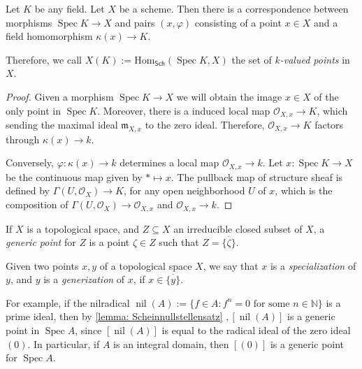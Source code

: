 \documentclass[11pt]{article}
\newcommand{\Spec}{\operatorname{Spec}}
\begin{document}
\begin{lemma}
    \cite[Exercise II.2.7]{hartsAG}
    Let $ K $ be any field. Let $ X $ be a scheme. Then there is a correspondence between morphisms 
    $ \Spec K \to X $ and pairs $ (x,\varphi) $ consisting of a point $ x \in X $ and a field homomorphism 
    $ \kappa(x) \to K $. 
    
    Therefore, we call $ X(K):= \mathrm{Hom}_{\mathsf{Sch}}(\Spec K,X) $ the set of $ k $\emph{-valued points} in $ X $. 
\end{lemma}

\begin{proof}
    Given a morphism $ \Spec K \to X $ we will obtain the image $ x \in X $ of the only point in $ \Spec K $. 
    Moreover, there is a induced local map $ \mathscr{O}_{X,x} \to K $, which sending the maximal ideal 
    $ \mathfrak{m}_{X,x} $ to the zero ideal. Therefore, $ \mathscr{O}_{X,x} \to K $ factors through 
    $ \kappa(x) \to k $. 
    
    Conversely, $ \varphi: \kappa(x) \to k $ determines a local map $ \mathscr{O}_{X,x} \to k $. 
    Let $ x: \Spec K \to X $ be the continuous map given by $ * \mapsto x $. 
    The pullback map of structure sheaf is defined by $ \Gamma(U,\mathscr{O}_{X}) \to K $, for any 
    open neighborhood $ U $ of $ x $, which is the composition of $ \Gamma(U,\mathscr{O}_{X}) \to \mathscr{O}_{X,x}$ 
    and $ \mathscr{O}_{X,x} \to k $. 
\end{proof}


\begin{definition}
    If $ X $ is a topological space, and $ Z \subseteq X $ an irreducible closed subset of $ X $, 
    a \emph{generic point} for $ Z $ is a point $ \zeta \in Z $ such that $ Z = \overline{\{ \zeta \}} $. 

    Given two points $ x,y $ of a topological space $ X $, we say that $ x $ is a \emph{specialization} 
    of $ y $, and $ y $ is a \emph{generization} of $ x $, if $ x \in \overline{\{ y \}} $. 
\end{definition}

For example, if the nilradical $ \operatorname{nil}(A):= \{f \in A: f^{n} = 0 \text{ for some } n \in \mathbb{N}\}$ 
is a prime ideal, then by \autoref{lemma: Scheinnullstellensatz} $, [\operatorname{nil}(A)] $ is a generic point in $ \Spec A $, 
since $ [\operatorname{nil}(A)] $ is equal to the radical ideal of the zero ideal $ (0) $. 
In particular, if $ A $ is an integral domain, then $ [(0)] $ is a generic point for $ \Spec A $. 
\end{document}
